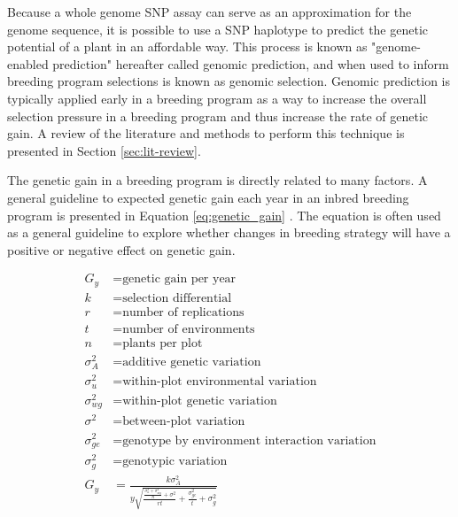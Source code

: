 Because a whole genome SNP assay can serve as an approximation for the genome sequence, 
it is possible to use a SNP haplotype to predict the genetic
potential of a plant in an affordable way. This process is known 
as "genome-enabled prediction" hereafter called genomic prediction, and when used to inform breeding 
program selections is known as genomic selection. Genomic prediction is typically 
applied early in a breeding program as a way to increase the overall selection 
pressure in a breeding program and thus increase the rate of genetic gain. A review of the 
literature and methods to perform this technique is presented in Section \ref{sec:lit-review}. 

The genetic gain in a breeding program is directly related to many factors. A 
general guideline to expected genetic gain each year in an inbred breeding 
program is presented in Equation \ref{eq:genetic_gain} \citep{fehr1987}. The equation is
often used as a general guideline to explore whether changes in breeding strategy will
have a positive or negative effect on genetic gain. 

\begin{equation} \label{eq:genetic_gain}
\begin{split}
    G_y           &= \textrm{genetic gain per year} \\
    k             &= \textrm{selection differential} \\
    r             &= \textrm{number of replications} \\
    t             &= \textrm{number of environments} \\
    n             &= \textrm{plants per plot} \\
    \sigma^2_{A}  &= \textrm{additive genetic variation} \\
    \sigma^2_{u}  &= \textrm{within-plot environmental variation} \\
    \sigma^2_{wg} &= \textrm{within-plot genetic variation} \\
    \sigma^2      &= \textrm{between-plot variation} \\
    \sigma^2_{ge} &= \textrm{genotype by environment interaction variation} \\
    \sigma^2_{g}  &= \textrm{genotypic variation} \\
    G_y           &= \frac{k\sigma^2_A}{y \sqrt{ \frac{\frac{\sigma^2_{u} + \sigma^2_{wg}}{n} + \sigma^2}{rt} + \frac{\sigma^2_{ge}}{t} + \sigma^2_{g} }} \\
\end{split}
\end{equation}

